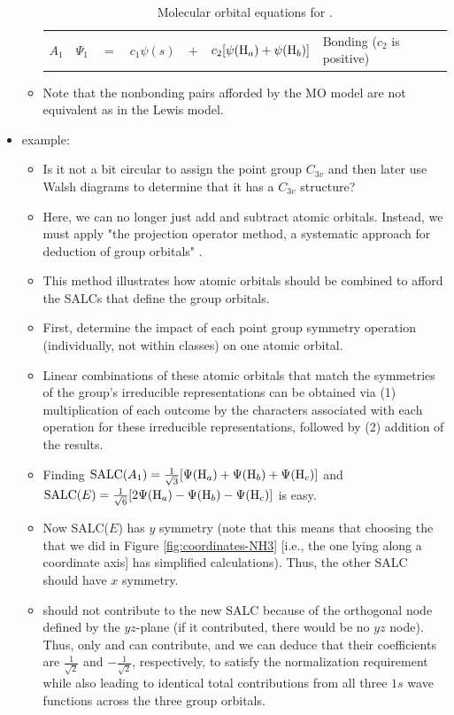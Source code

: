 \documentclass[../notes.tex]{subfiles}
\begin{document}
\begin{itemize}
\begin{itemize}
\begin{table}[h!]
\begin{tabular}{lccccll}
                \rowcolor{grt}
                $A_1$ & $\Psi_1$ & $=$ & $c_1\psi(s)$ & $+$ & $c_2[\psi(\ce{H}_a)+\psi(\ce{H}_b)]$ & Bonding ($c_2$ is positive)\\
            \end{tabular}
            \caption{Molecular orbital equations for .}
            \label{tab:Psi-H2O}
        \end{table}
        \item Note that the nonbonding pairs afforded by the MO model are not equivalent as in the Lewis model.
    \end{itemize}
    \item {} example:
    \begin{itemize}
        \item Is it not a bit circular to assign the point group $C_{3v}$ and then later use Walsh diagrams to determine that it has a $C_{3v}$ structure?
        \item Here, we can no longer just add and subtract atomic orbitals. Instead, we must apply "the projection operator method, a systematic approach for deduction of group orbitals" \parencite[152]{bib:MiesslerFischerTarr}.
        \item This method illustrates how atomic orbitals should be combined to afford the SALCs that define the group orbitals.
        \item First, determine the impact of each point group symmetry operation (individually, not within classes) on one atomic orbital.
        \item Linear combinations of these atomic orbitals that match the symmetries of the group's irreducible representations can be obtained via (1) multiplication of each outcome by the characters associated with each operation for these irreducible representations, followed by (2) addition of the results.
        \item Finding $\text{SALC}(A_1)=\frac{1}{\sqrt{3}}[\Psi(\ce{H}_a)+\Psi(\ce{H}_b)+\Psi(\ce{H}_c)]$ and $\text{SALC}(E)=\frac{1}{\sqrt{6}}[2\Psi(\ce{H}_a)-\Psi(\ce{H}_b)-\Psi(\ce{H}_c)]$ is easy.
        \item Now SALC($E$) has $y$ symmetry (note that this means that choosing the  that we did in Figure \ref{fig:coordinates-NH3} [i.e., the one lying along a coordinate axis] has simplified calculations). Thus, the other SALC should have $x$ symmetry.
        \item {} should not contribute to the new SALC because of the orthogonal node defined by the $yz$-plane (if it contributed, there would be no $yz$ node). Thus, only  and  can contribute, and we can deduce that their coefficients are $\frac{1}{\sqrt{2}}$ and $-\frac{1}{\sqrt{2}}$, respectively, to satisfy the normalization requirement while also leading to identical total contributions from all three $1s$ wave functions across the three group orbitals.

\end{itemize}
\end{itemize}
\end{document}
